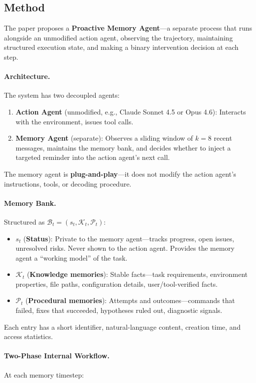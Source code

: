\documentclass[11pt,a4paper]{article}
\begin{document}
\subsection{Method}

The paper proposes a \textbf{Proactive Memory Agent}---a separate process that runs alongside an unmodified action agent, observing the trajectory, maintaining structured execution state, and making a binary intervention decision at each step.

\paragraph{Architecture.} The system has two decoupled agents:
\begin{enumerate}
\item \textbf{Action Agent} (unmodified, e.g., Claude Sonnet 4.5 or Opus 4.6): Interacts with the environment, issues tool calls.
\item \textbf{Memory Agent} (separate): Observes a sliding window of $k = 8$ recent messages, maintains the memory bank, and decides whether to inject a targeted reminder into the action agent's next call.
\end{enumerate}
The memory agent is \textbf{plug-and-play}---it does not modify the action agent's instructions, tools, or decoding procedure.

\paragraph{Memory Bank.} Structured as $\mathcal{B}_t = (s_t, \mathcal{K}_t, \mathcal{P}_t)$:
\begin{itemize}
\item $s_t$ (\textbf{Status}): Private to the memory agent---tracks progress, open issues, unresolved risks. Never shown to the action agent. Provides the memory agent a ``working model'' of the task.
\item $\mathcal{K}_t$ (\textbf{Knowledge memories}): Stable facts---task requirements, environment properties, file paths, configuration details, user/tool-verified facts.
\item $\mathcal{P}_t$ (\textbf{Procedural memories}): Attempts and outcomes---commands that failed, fixes that succeeded, hypotheses ruled out, diagnostic signals.
\end{itemize}
Each entry has a short identifier, natural-language content, creation time, and access statistics.

\paragraph{Two-Phase Internal Workflow.} At each memory timestep:
\end{document}
